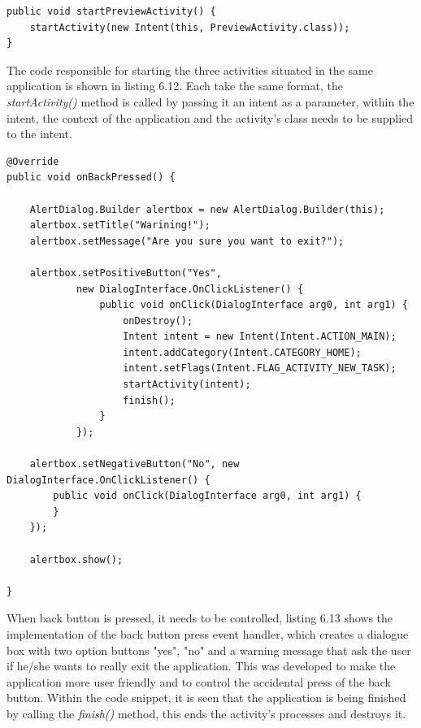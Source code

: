 \begin{lstlisting}[label=activity-starter,caption=Activity starter] 
public void startPreviewActivity() {
	startActivity(new Intent(this, PreviewActivity.class));
}     
\end{lstlisting} 

The code responsible for starting the three activities situated in the same application is shown in listing 6.12. Each take the same format, the {\it startActivity()} method is called by passing it an intent as a parameter, within the intent, the context of the application and the activity's class needs to be supplied to the intent.

\begin{lstlisting}[label=back-button-press,caption=Returning to previous event when back button is pressed] 
@Override
public void onBackPressed() {

	AlertDialog.Builder alertbox = new AlertDialog.Builder(this);
	alertbox.setTitle("Warining!");
	alertbox.setMessage("Are you sure you want to exit?");

	alertbox.setPositiveButton("Yes",
			new DialogInterface.OnClickListener() {
				public void onClick(DialogInterface arg0, int arg1) {
					onDestroy();
					Intent intent = new Intent(Intent.ACTION_MAIN);
					intent.addCategory(Intent.CATEGORY_HOME);
					intent.setFlags(Intent.FLAG_ACTIVITY_NEW_TASK);
					startActivity(intent);
					finish();
				}
			});

	alertbox.setNegativeButton("No", new DialogInterface.OnClickListener() {
		public void onClick(DialogInterface arg0, int arg1) {
		}
	});

	alertbox.show();

}
\end{lstlisting}

When back button is pressed, it needs to be controlled, listing 6.13 shows the implementation of the back button press event handler, which creates a dialogue box with two option buttons "yes", "no" and a warning message that ask the user if he/she wants to really exit the application. This was developed to make the application more user friendly and to control the accidental press of the back button. Within the code snippet, it is seen that the application is being finished by calling the {\it finish()} method, this ends the activity's processes and destroys it.

